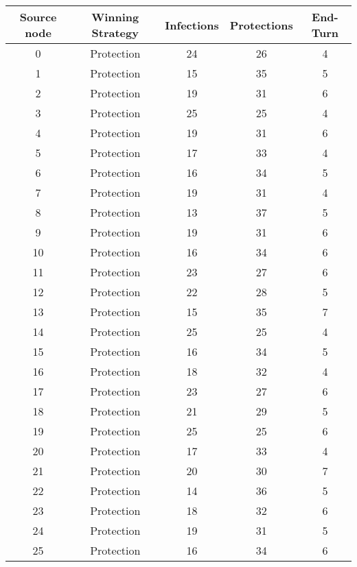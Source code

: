 \documentclass[results.tex]{subfiles}
\begin{document}
\begin{center}
  \begin{tabular}{| c || c | c | c | c |}
    \hline
    {\bfseries Source node} & {\bfseries Winning Strategy} & {\bfseries Infections} & {\bfseries Protections} & {\bfseries End-Turn} \\  %
    \hline\hline
    0 & Protection & 24 & 26 & 4 \\ 
    \hline
    1 & Protection & 15 & 35 & 5 \\ 
    \hline
    2 & Protection & 19 & 31 & 6 \\ 
    \hline
    3 & Protection & 25 & 25 & 4 \\ 
    \hline
    4 & Protection & 19 & 31 & 6 \\ 
    \hline
    5 & Protection & 17 & 33 & 4 \\ 
    \hline
    6 & Protection & 16 & 34 & 5 \\ 
    \hline
    7 & Protection & 19 & 31 & 4 \\ 
    \hline
    8 & Protection & 13 & 37 & 5 \\ 
    \hline
    9 & Protection & 19 & 31 & 6 \\ 
    \hline
    10 & Protection & 16 & 34 & 6 \\ 
    \hline
    11 & Protection & 23 & 27 & 6 \\ 
    \hline
    12 & Protection & 22 & 28 & 5 \\ 
    \hline
    13 & Protection & 15 & 35 & 7 \\ 
    \hline
    14 & Protection & 25 & 25 & 4 \\ 
    \hline
    15 & Protection & 16 & 34 & 5 \\ 
    \hline
    16 & Protection & 18 & 32 & 4 \\ 
    \hline
    17 & Protection & 23 & 27 & 6 \\ 
    \hline
    18 & Protection & 21 & 29 & 5 \\ 
    \hline
    19 & Protection & 25 & 25 & 6 \\ 
    \hline
    20 & Protection & 17 & 33 & 4 \\ 
    \hline
    21 & Protection & 20 & 30 & 7 \\ 
    \hline
    22 & Protection & 14 & 36 & 5 \\ 
    \hline
    23 & Protection & 18 & 32 & 6 \\ 
    \hline
    24 & Protection & 19 & 31 & 5 \\ 
    \hline
    25 & Protection & 16 & 34 & 6 \\ 

\end{tabular}
\end{center}
\end{document}
